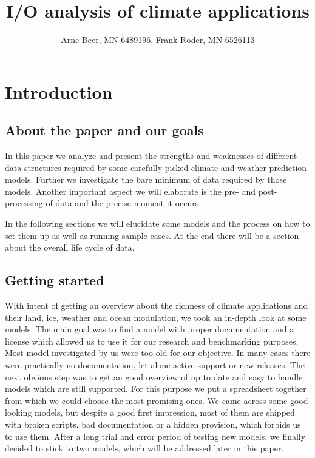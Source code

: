 \documentclass[]{article}
\title{I/O analysis of climate applications}
\author{Arne Beer, MN 6489196, Frank Röder, MN 6526113}
\date{}
\begin{document}
\maketitle

{
\setcounter{tocdepth}{3}
\tableofcontents
}
\pagebreak

\section{Introduction}\label{introduction}

\subsection{About the paper and our
goals}\label{about-the-paper-and-our-goals}

In this paper we analyze and present the strengths and weaknesses of
different data structures required by some carefully picked climate and
weather prediction models. Further we investigate the bare minimum of
data required by those models. Another important aspect we will
elaborate is the pre- and post-processing of data and the precise moment
it occurs.

In the following sections we will elucidate some models and the process
on how to set them up as well as running sample cases. At the end there
will be a section about the overall life cycle of data.

\subsection{Getting started}\label{getting-started}

With intent of getting an overview about the richness of climate
applications and their land, ice, weather and ocean modulation, we took
an in-depth look at some models. The main goal was to find a model with
proper documentation and a license which allowed us to use it for our
research and benchmarking purposes. Most model investigated by us were
too old for our objective. In many cases there were practically no
documentation, let alone active support or new releases. The next
obvious step was to get an good overview of up to date and easy to
handle models which are still supported. For this purpose we put a
spreadsheet together from which we could choose the most promising ones.
We came across some good looking models, but despite a good first
impression, most of them are shipped with broken scripts, bad
documentation or a hidden provision, which forbids us to use them. After
a long trial and error period of testing new models, we finally decided
to stick to two models, which will be addressed later in this paper.
\end{document}
